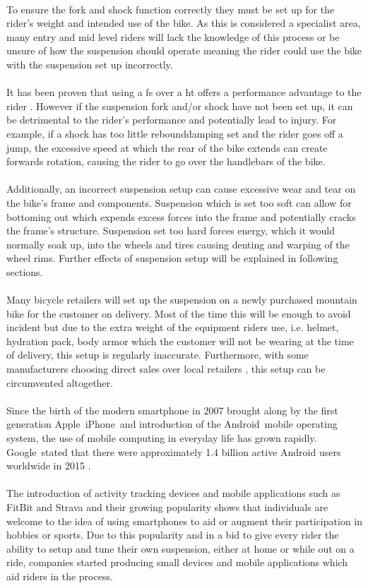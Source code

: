 	\\
	To ensure the \gls{fork} and \gls{shock} function correctly they must be set up for the rider's weight and intended use of the bike. As this is considered a specialist area, many entry and mid level riders will lack the knowledge of this process or be unsure of how the suspension should operate meaning the rider could use the bike with the suspension set up incorrectly.
	\\\\
	It has been proven that using a \gls{fs} over a \gls{ht} offers a performance advantage to the rider \citep{fullsusperf}. However if the suspension fork and/or shock have not been set up, it can be detrimental to the rider's performance and potentially lead to injury. For example, if a shock has too little \gls{rebounddamping} set and the rider goes off a jump, the excessive speed at which the rear of the bike extends can create forwards rotation, causing the rider to go over the handlebars of the bike.
	\\\\
	Additionally, an incorrect suspension setup can cause excessive wear and tear on the bike's frame and components. Suspension which is set too soft can allow for bottoming out which expends excess forces into the frame and potentially cracks the frame's structure. Suspension set too hard forces energy, which it would normally soak up, into the wheels and tires causing denting and warping of the wheel rims. Further effects of suspension setup will be explained in following sections.
	\\\\
	Many bicycle retailers will set up the suspension on a newly purchased mountain bike for the customer on delivery. Most of the time this will be enough to avoid incident but due to the extra weight of the equipment riders use, i.e. helmet, hydration pack, body armor which the customer will not be wearing at the time of delivery, this setup is regularly inaccurate. Furthermore, with some manufacturers choosing direct sales over local retailers \citep{roseonline, ytonline}, this setup can be circumvented altogether.
	\\\\
	Since the birth of the modern smartphone in 2007 brought along by the first generation Apple\textregistered\ iPhone\textregistered\ and introduction of the Android\texttrademark\ mobile operating system, the use of mobile computing in everyday life has grown rapidly. Google\texttrademark\ stated that there were approximately 1.4 billion active Android users worldwide in 2015 \citep{androidusers}.
	\\\\
	The introduction of activity tracking devices and mobile applications such as FitBit \citep{fitbit} and Strava \citep{strava} and their growing popularity \citep{apppopularity} shows that individuals are welcome to the idea of using smartphones to aid or augment their participation in hobbies or sports. Due to this popularity and in a bid to give every rider the ability to setup and tune their own suspension, either at home or while out on a ride, companies started producing small devices \citep{sussmybike, shockwiztrademark} and mobile applications \citep{foxird} which aid riders in the process.
